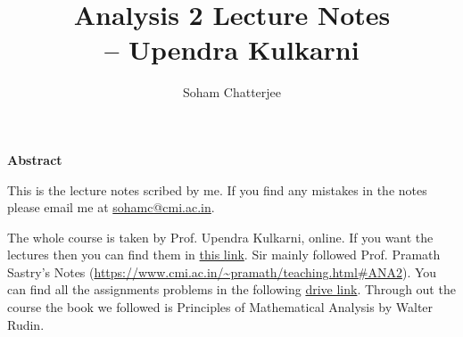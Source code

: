 \documentclass{report}
\title{\Huge{Analysis 2 Lecture Notes}\\ \hspace{4cm}-- Upendra Kulkarni}
\author{\huge{Soham Chatterjee}}
\date{}
\begin{document}
\thispagestyle{empty}
\newpage%
\vspace*{5cm}

\begin{center}
	\textbf{Abstract}
\end{center}

This is the lecture notes scribed by me. If you find any mistakes in the notes please email me at \url{sohamc@cmi.ac.in}. 

The whole course is taken by Prof. Upendra Kulkarni, online. If you want the lectures then you can find them in \href{https://youtube.com/playlist?list=PL8I7rVYxS9smyQemVlU10yF9F37ZQN38P}{this link}. Sir mainly followed Prof. Pramath Sastry's Notes (\url{https://www.cmi.ac.in/~pramath/teaching.html#ANA2}). You can find all the assignments problems in the following  \href{https://drive.google.com/drive/folders/1dODMladIJ1f4BfMXVxoU5_YkfmWU8v4q?usp=share_link}{drive link}. Through out the course the book we followed is  Principles of Mathematical Analysis by Walter Rudin. 
\pagebreak

\tableofcontents
\pagebreak


































\end{document}
